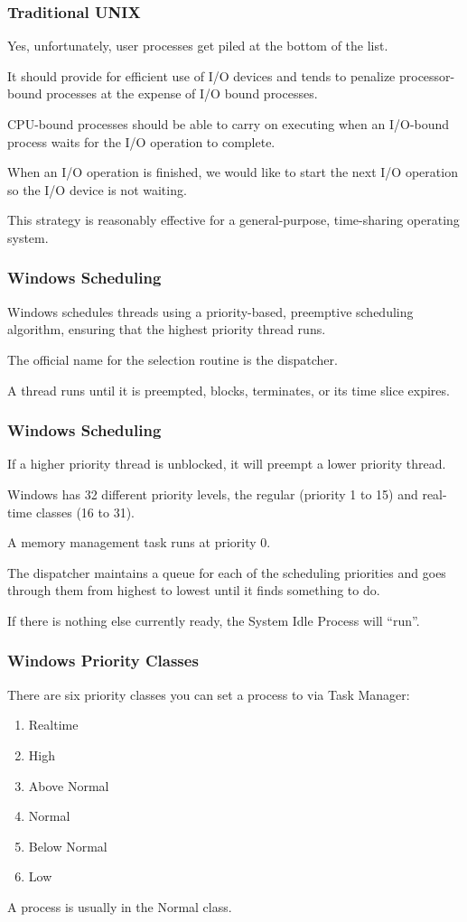 \begin{frame}
\frametitle{Traditional UNIX}

Yes, unfortunately, user processes get piled at the bottom of the list. 

It should provide for efficient use of I/O devices and tends to penalize processor-bound processes at the expense of I/O bound processes. 

CPU-bound processes should be able to carry on executing when an I/O-bound process waits for the I/O operation to complete. 

When an I/O operation is finished, we would like to start the next I/O operation so the I/O device is not waiting.

This strategy is reasonably effective for a general-purpose, time-sharing operating system.

\end{frame}

\begin{frame}
\frametitle{Windows Scheduling}

Windows schedules threads using a priority-based, preemptive scheduling algorithm, ensuring that the highest priority thread runs. 

The official name for the selection routine is the \alert{dispatcher}.

A thread runs until it is preempted, blocks, terminates, or its time slice expires. 

\end{frame}

\begin{frame}
\frametitle{Windows Scheduling}

If a higher priority thread is unblocked, it will preempt a lower priority thread. 

Windows has 32 different priority levels, the regular (priority 1 to 15) and real-time classes (16 to 31). 

A memory management task runs at priority 0.

The dispatcher maintains a queue for each of the scheduling priorities and goes through them from highest to lowest until it finds something to do.

If there is nothing else currently ready, the System Idle Process will ``run''.

\end{frame}

\begin{frame}
\frametitle{Windows Priority Classes}

There are six priority classes you can set a process to via Task Manager:

\begin{enumerate}
	\item Realtime
	\item High
	\item Above Normal
	\item Normal
	\item Below Normal
	\item Low
\end{enumerate}

A process is usually in the Normal class.

\end{frame}

